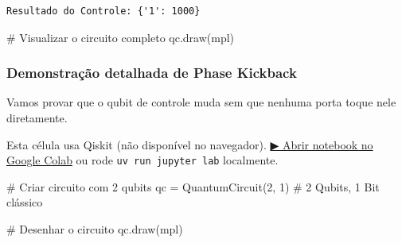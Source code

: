 \documentclass[
  brazilian,
]{report}
\newenvironment{Shaded}{\begin{snugshade}}{\end{snugshade}}
\newcommand{\CommentTok}[1]{\textcolor[rgb]{0.37,0.37,0.37}{#1}}
\newcommand{\DecValTok}[1]{\textcolor[rgb]{0.68,0.00,0.00}{#1}}
\newcommand{\NormalTok}[1]{\textcolor[rgb]{0.00,0.23,0.31}{#1}}
\newcommand{\OperatorTok}[1]{\textcolor[rgb]{0.37,0.37,0.37}{#1}}
\newcommand{\StringTok}[1]{\textcolor[rgb]{0.13,0.47,0.30}{#1}}
\begin{document}
\begin{verbatim}
Resultado do Controle: {'1': 1000}
\end{verbatim}

\begin{Shaded}
\begin{Highlighting}[]

\NormalTok{\# Visualizar o circuito completo}
\NormalTok{qc.draw(\textquotesingle{}mpl\textquotesingle{})}
\end{Highlighting}
\end{Shaded}

\subsubsection{Demonstração detalhada de Phase
Kickback}\label{demonstrauxe7uxe3o-detalhada-de-phase-kickback}

Vamos provar que o qubit de controle muda sem que nenhuma porta toque
nele diretamente.

\begin{tcolorbox}[enhanced jigsaw, arc=.35mm, bottomrule=.15mm, bottomtitle=1mm, breakable, colback=white, colbacktitle=quarto-callout-warning-color!10!white, colframe=quarto-callout-warning-color-frame, coltitle=black, left=2mm, leftrule=.75mm, opacityback=0, opacitybacktitle=0.6, rightrule=.15mm, title=\textcolor{quarto-callout-warning-color}{\faExclamationTriangle}\hspace{0.5em}{⚛️ Célula Qiskit --- execute no Colab ou localmente}, titlerule=0mm, toprule=.15mm, toptitle=1mm]

Esta célula usa Qiskit (não disponível no navegador).
\href{https://colab.research.google.com/github/maxwellamaral/aula-quantum/blob/main/notebooks/05-interference.ipynb}{▶
Abrir notebook no Google Colab} ou rode \texttt{uv\ run\ jupyter\ lab}
localmente.

\begin{Shaded}
\begin{Highlighting}[]


\CommentTok{\# Criar circuito com 2 qubits}
\NormalTok{qc }\OperatorTok{=}\NormalTok{ QuantumCircuit(}\DecValTok{2}\NormalTok{, }\DecValTok{1}\NormalTok{) }\CommentTok{\# 2 Qubits, 1 Bit clássico}

\CommentTok{\# Desenhar o circuito}
\NormalTok{qc.draw(}\StringTok{\textquotesingle{}mpl\textquotesingle{}}\NormalTok{)}
\end{Highlighting}
\end{Shaded}

\end{tcolorbox}
\end{document}
